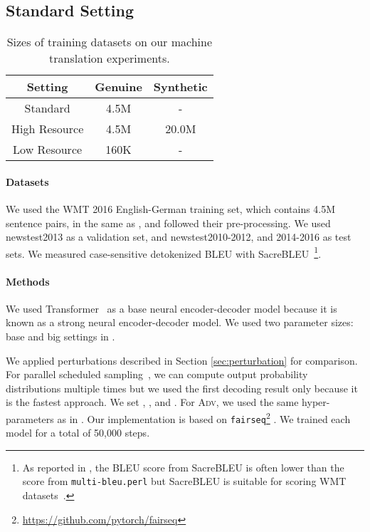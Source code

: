 \documentclass[11pt]{article}
\newcommand{\adv}{\textsc{Adv}}
\begin{document}
\subsection{Standard Setting}
\label{sec:exp_standard_mt}

\begin{table}[!t]
  \centering
\begin{tabular}{ c | c | c } \hline
  Setting & Genuine & Synthetic \\ \hline
  Standard & 4.5M & - \\
  High Resource & 4.5M & 20.0M \\
  Low Resource & 160K & - \\ \hline
  \end{tabular}
  \caption{Sizes of training datasets on our machine translation experiments.}
  \label{table:mt_dataset}
\end{table}
\paragraph{Datasets}
We used the WMT 2016 English-German training set, which contains 4.5M sentence pairs, in the same as , and followed their pre-processing.
We used newstest2013 as a validation set, and newstest2010-2012, and 2014-2016 as test sets.
We measured case-sensitive detokenized BLEU with SacreBLEU~\cite{post-2018-call}\footnote{As reported in , the BLEU score from SacreBLEU is often lower than the score from \texttt{multi-bleu.perl} but SacreBLEU is suitable for scoring WMT datasets~\cite{post-2018-call}.}.


\paragraph{Methods}
We used Transformer~\cite{NIPS2017_7181} as a base neural encoder-decoder model because it is known as a strong neural encoder-decoder model.
We used two parameter sizes: base and big settings in .


We applied perturbations described in Section \ref{sec:perturbation} for comparison.
For parallel scheduled sampling~\cite{DBLP:journals/corr/abs-1906-04331}, we can compute output probability distributions multiple times but we used the first decoding result only because it is the fastest approach.
We set , , and .
For \adv{}, we used the same hyper-parameters as in .
Our implementation is based on \texttt{fairseq}\footnote{\href{https://github.com/pytorch/fairseq}{https://github.com/pytorch/fairseq}} \cite{ott-etal-2019-fairseq}.
We trained each model for a total of 50,000 steps.
\end{document}
